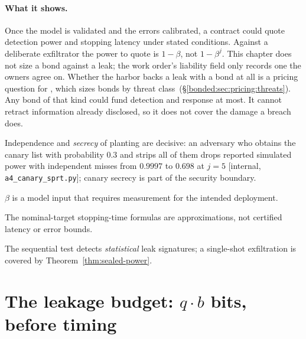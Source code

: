 \documentclass[11pt,a4paper]{article}
\theoremstyle{definition}
\begin{document}


\paragraph{What it shows.}
Once the model is validated and the errors calibrated, a contract could
quote detection power and stopping latency under stated conditions. Against
a deliberate exfiltrator the power to quote is $1-\beta$, not $1-\beta^j$.
This chapter does not size a bond against a leak; the work order's liability
field only records one the owners agree on. Whether the harbor backs a leak
with a bond at all is a pricing question for , which sizes bonds by
threat class\ifpdbook\ (\S\ref{bonded:sec:pricing:threats})\fi. Any bond
of that kind could fund detection and response at most. It cannot retract
information already disclosed, so it does not cover the damage a breach
does.

\begin{pdboundary}
\setlength{\parskip}{4pt plus 1pt}
Independence and \emph{secrecy} of planting are decisive: an adversary who
obtains the canary list with probability $0.3$ and strips all of them drops
reported simulated power with independent misses from $0.9997$ to $0.698$ at
$j=5$ [internal,
\texttt{a4\_canary\_sprt.py}]; canary secrecy is part of the security
boundary.

$\beta$ is a model input that requires measurement for the intended
deployment.

The nominal-target stopping-time formulas are approximations,
not certified latency or error bounds.

The sequential test detects \emph{statistical} leak signatures; a
single-shot exfiltration is covered by Theorem~\ref{thm:sealed-power}.
\end{pdboundary}

\pdexercisepointer{\ref{ex:sealed-power}}{\ref{ex:sealed-canary-secrecy}}{\pageref{ex:sealed-power}}



\section{The leakage budget: $q\cdot b$ bits, before timing}\label{sec:sealed-budget}
\end{document}
